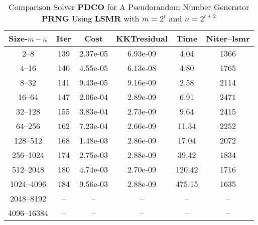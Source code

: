 \documentclass[letterpaper,12pt,oneside,final]{book}
\begin{document}
\begin{table}
\caption{Comparison Solver   {\bf PDCO} for  A Pseudorandom Number Generator {\bf PRNG } Using {\bf LSMR} with  $m=2^{t}$ and $n=2^{t+2}$} 
\begin{center}
\begin{tabular}{|*{6}{c}|} \hline
Size-$m\--n$ & \multicolumn{1}{c}{Iter} & \multicolumn{1}{c}{Cost}& \multicolumn{1}{c}{KKTresidual} & \multicolumn{1}{c}{Time} & \multicolumn{1}{c|}{Niter--lsmr} \\ 
\hline
2--8            &139  & 2.37e-05& 6.93e-09& 4.04 & 1366  \\
4--16           &140  & 4.55e-05& 6.13e-08& 4.80 & 1765  \\
8--32           &141  & 9.43e-05& 9.16e-09& 2.58 & 2114  \\
16--64          &147  & 2.06e-04& 2.89e-09& 6.91 & 2471  \\
32--128         &155  & 3.83e-04& 2.73e-09& 9.64 & 2415  \\
64--256         &162  & 7.23e-04& 2.66e-09& 11.34& 2252  \\
128--512        &168  & 1.48e-03& 2.86e-09& 17.04& 2072  \\
256--1024       &174  & 2.75e-03& 2.88e-09& 39.42& 1834  \\
512--2048       &180  & 4.74e-03& 2.70e-09& 120.42& 1716  \\
1024--4096      &184  & 9.56e-03& 2.88e-09& 475.15& 1635  \\
2048--8192     &--    &--        &--       &--          &--  \\ 
4096--16384    &--    &--        &--        &--         &-- \\
\hline
\end{tabular}
\end{center}
\end{table}
\end{document}
